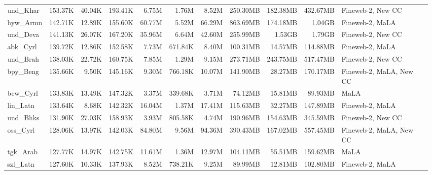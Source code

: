 \begin{table*}[!htp]
{\begin{tabular}{l|rrr|rrr|rrr|l}
und\_Khar                   & 153.37K    & 40.04K       & 193.41K     & 6.75M        & 1.76M          & 8.52M         & 250.30MB   & 182.38MB     & 432.67MB    & Fineweb-2, New CC       \\
hyw\_Armn                   & 142.71K    & 12.89K       & 155.60K     & 60.77M       & 5.52M          & 66.29M        & 863.69MB   & 174.18MB     & 1.04GB      & Fineweb-2, MaLA         \\
und\_Deva                   & 141.13K    & 26.07K       & 167.20K     & 35.96M       & 6.64M          & 42.60M        & 255.99MB   & 1.53GB       & 1.79GB      & Fineweb-2, New CC       \\
abk\_Cyrl                   & 139.72K    & 12.86K       & 152.58K     & 7.73M        & 671.84K        & 8.40M         & 100.31MB   & 14.57MB      & 114.88MB    & Fineweb-2, MaLA         \\
und\_Brah                   & 138.03K    & 22.72K       & 160.75K     & 7.85M        & 1.29M          & 9.15M         & 273.71MB   & 243.75MB     & 517.47MB    & Fineweb-2, New CC       \\
bpy\_Beng                   & 135.66K    & 9.50K        & 145.16K     & 9.30M        & 766.18K        & 10.07M        & 141.90MB   & 28.27MB      & 170.17MB    & Fineweb-2, MaLA, New CC \\
bew\_Cyrl                   & 133.83K    & 13.49K       & 147.32K     & 3.37M        & 339.68K        & 3.71M         & 74.12MB    & 15.81MB      & 89.93MB     & MaLA                    \\
lin\_Latn                   & 133.64K    & 8.68K        & 142.32K     & 16.04M       & 1.37M          & 17.41M        & 115.63MB   & 32.27MB      & 147.89MB    & Fineweb-2, MaLA         \\
und\_Bhks                   & 131.90K    & 27.03K       & 158.93K     & 3.93M        & 805.58K        & 4.74M         & 190.96MB   & 154.63MB     & 345.59MB    & Fineweb-2, New CC       \\
oss\_Cyrl                   & 128.06K    & 13.97K       & 142.03K     & 84.80M       & 9.56M          & 94.36M        & 390.43MB   & 167.02MB     & 557.45MB    & Fineweb-2, MaLA, New CC \\
tgk\_Arab                   & 127.77K    & 14.97K       & 142.75K     & 11.61M       & 1.36M          & 12.97M        & 104.11MB   & 55.51MB      & 159.62MB    & MaLA                    \\
szl\_Latn                   & 127.60K    & 10.33K       & 137.93K     & 8.52M        & 738.21K        & 9.25M         & 89.99MB    & 12.81MB      & 102.80MB    & Fineweb-2, MaLA         \\

\end{tabular}}
\end{table*}
